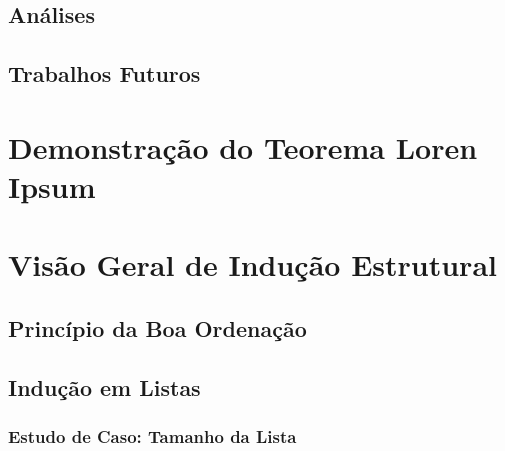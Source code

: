 \documentclass[times,english,brazil,oneside,section=TITLE]{ifes8}
\begin{document}
\section{Análises}

\blindtext[7]

\section{Trabalhos Futuros}

\blindtext[7]


\postextual




\apendices

\partapendices*

\chapter{Demonstração do Teorema Loren Ipsum}

\blindtext[7]


\chapter{Visão Geral de Indução Estrutural}

\section{Princípio da Boa Ordenação}

\blindtext[3]

\section{Indução em Listas}

\blindtext[2]

\subsection{Estudo de Caso: Tamanho da Lista}
\end{document}
